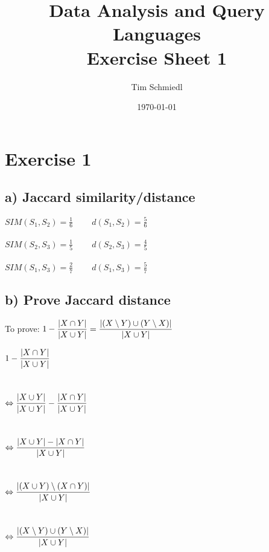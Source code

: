 \documentclass{article}
\begin{document}
\title{Data Analysis and Query Languages \\
 Exercise Sheet 1}
\date{\today}
\author{Tim Schmiedl}
\maketitle

\section*{Exercise 1}

\subsection*{a) Jaccard similarity/distance}
$SIM(S_1,S_2) = \frac{1}{6} \;\;\;\;\;\;\;\; d(S_1,S_2) = \frac{5}{6}$\\
\\
$SIM(S_2,S_3) = \frac{1}{5} \;\;\;\;\;\;\;\; d(S_2,S_3) = \frac{4}{5}$\\
\\
$SIM(S_1,S_3) = \frac{2}{7} \;\;\;\;\;\;\;\; d(S_1,S_3) = \frac{5}{7}$

\vspace{1cm}
\subsection*{b) Prove Jaccard distance}
To prove:
$\mathlarger{
1 - \frac{| X \cap Y |}{| X \cup Y |}
=
\frac{|(X \setminus Y) \cup (Y \setminus X) |}{| X \cup Y |}
}$


\vspace{0.5cm}
$\mathlarger{1 - \frac{| X \cap Y |}{| X \cup Y |}}$\\
\\\\
$\mathlarger{\Leftrightarrow \frac{| X \cup Y |}{| X \cup Y |} - \frac{| X \cap Y
|}{| X \cup Y|}}$\\
\\\\
$\mathlarger{\Leftrightarrow \frac{| X \cup Y | - | X \cap Y
|}{| X \cup Y|}}$\\
\\\\
$\mathlarger{\Leftrightarrow \frac{|( X \cup Y)  \setminus  (X \cap Y)
|}{| X \cup Y|}}$\\
\\\\
$\mathlarger{\Leftrightarrow \frac{|(X \setminus Y) \cup (Y \setminus X)
|}{| X \cup Y|}}$\\
\end{document}
